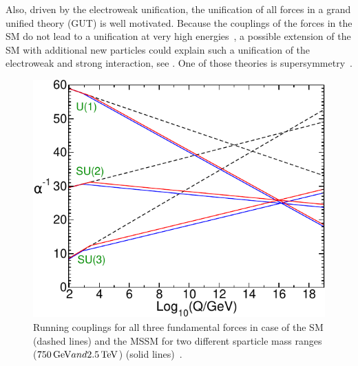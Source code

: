 Also, driven by the electroweak unification, the unification of all forces in a grand unified theory (GUT) is well motivated. Because the couplings of the forces in the SM do not lead to a unification at very high energies~\cite{PDG}, a possible extension of the SM with additional new particles could explain such a unification of the electroweak and strong interaction, see . One of those theories is supersymmetry~\cite{SUSYOriginal}.
\begin{figure}
 \includegraphics[width=\pairwidth]{figures/general/couplings}
 \caption{Running couplings for all three fundamental forces in case of the SM (dashed lines) and the MSSM for two different sparticle mass ranges ($750\,\text{Ge\hspace{-.08em}V} and 2.5\,\text{Te\hspace{-.08em}V}$) (solid lines)~\cite{SUSYPrimer}.}
 \label{fig:couplings}
\end{figure}



